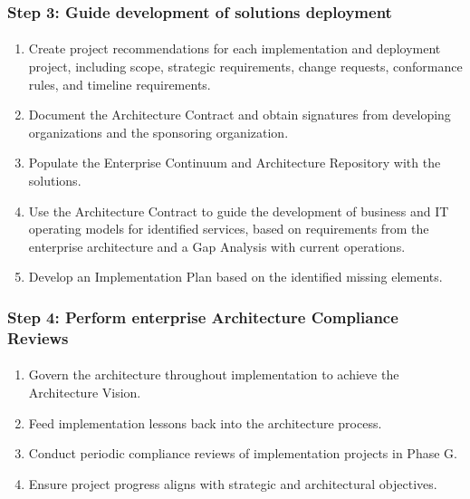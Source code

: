\documentclass[aspectratio=169, table]{beamer}
\begin{document}
	\begin{frame}
		\frametitle{Step 3: Guide development of solutions deployment}
		\framesubtitle{\hspace{1cm}}
		\vspace{20pt}
		\begin{enumerate}
			\item Create project recommendations for each implementation and deployment project, including scope, strategic requirements, change requests, conformance rules, and timeline requirements.
			\item Document the Architecture Contract and obtain signatures from developing organizations and the sponsoring organization.
			\item Populate the Enterprise Continuum and Architecture Repository with the solutions.
			\item Use the Architecture Contract to guide the development of business and IT operating models for identified services, based on requirements from the enterprise architecture and a Gap Analysis with current operations.
			\item Develop an Implementation Plan based on the identified missing elements.
		\end{enumerate}
	\end{frame}
	
	\begin{frame}
		\frametitle{Step 4: Perform enterprise Architecture Compliance Reviews}
		\framesubtitle{\hspace{1cm}}
		\vspace{20pt}
		\begin{enumerate}
			\item Govern the architecture throughout implementation to achieve the Architecture Vision.
			\item Feed implementation lessons back into the architecture process.
			\item Conduct periodic compliance reviews of implementation projects in Phase G.
			\item Ensure project progress aligns with strategic and architectural objectives.
		\end{enumerate}
		
	\end{frame}
\end{document}
